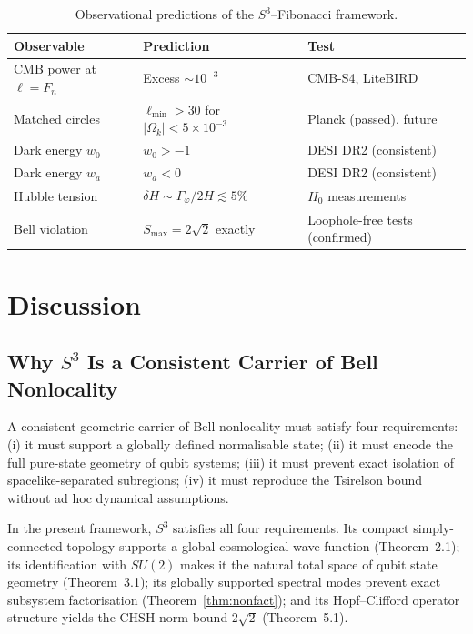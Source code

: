 \documentclass[12pt,a4paper]{article}
\theoremstyle{definition}
\theoremstyle{remark}
\begin{document}
\begin{table}[h]
\centering
\renewcommand{\arraystretch}{1.4}
\begin{tabular}{lll}
\toprule
\textbf{Observable} & \textbf{Prediction} & \textbf{Test} \\
\midrule
CMB power at $\ell=F_n$ & Excess $\sim 10^{-3}$ & CMB-S4, LiteBIRD \\
Matched circles & $\ell_{\min}>30$ for $|\Omega_k|<5\times 10^{-3}$ & Planck (passed), future \\
Dark energy $w_0$ & $w_0 > -1$ & DESI DR2 (consistent) \\
Dark energy $w_a$ & $w_a < 0$ & DESI DR2 (consistent) \\
Hubble tension & $\delta H \sim \Gamma_\varphi/2H \lesssim 5\%$ & $H_0$ measurements \\
Bell violation & $S_{\max}=2\sqrt{2}$ exactly & Loophole-free tests (confirmed) \\
\bottomrule
\end{tabular}
\caption{Observational predictions of the $S^3$--Fibonacci framework.}
\end{table}

\section{Discussion}
\label{sec:discussion}

\subsection{Why $S^3$ Is a Consistent Carrier of Bell Nonlocality}

A consistent geometric carrier of Bell nonlocality must satisfy four requirements:
(i) it must support a globally defined normalisable state; (ii) it must encode the
full pure-state geometry of qubit systems; (iii) it must prevent exact isolation of
spacelike-separated subregions; (iv) it must reproduce the Tsirelson bound without
ad hoc dynamical assumptions.

In the present framework, $S^3$ satisfies all four requirements. Its compact
simply-connected topology supports a global cosmological wave function (Theorem~2.1);
its identification with $SU(2)$ makes it the natural total space of qubit state
geometry (Theorem~3.1); its globally supported spectral modes prevent exact subsystem
factorisation (Theorem~\ref{thm:nonfact}); and its Hopf--Clifford operator structure
yields the CHSH norm bound $2\sqrt{2}$ (Theorem~5.1).
\end{document}
